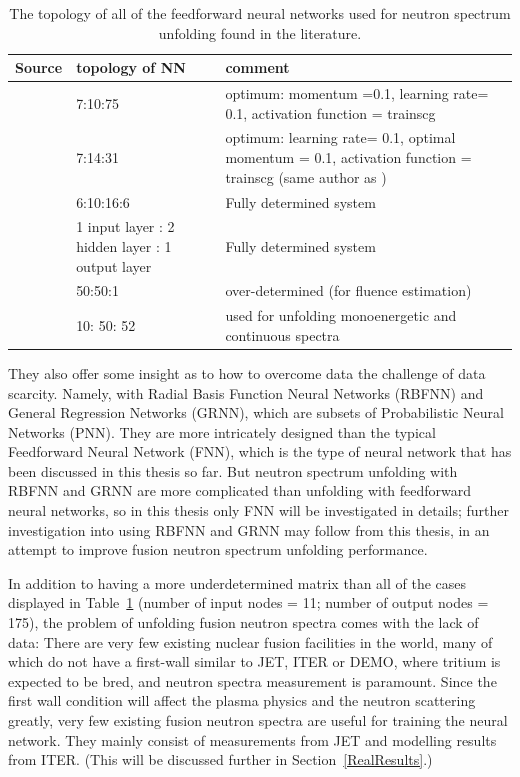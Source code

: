 \documentclass[a4paper, 12pt]{article}
\begin{document}
    \begin{table}
    \begin{tabularx}{\textwidth}{cXX}
    Source & topology of NN & comment \\
    \hline
    \cite{Rodrigues-UnfoldingCompuerCodeBasedOnANN} & 7:10:75 & optimum: momentum =0.1, learning rate= 0.1, activation function = trainscg\\
    \cite{RDANNM} & 7:14:31 & optimum: learning rate= 0.1, optimal momentum = 0.1, activation function = trainscg (same author as \cite{Rodrigues-UnfoldingCompuerCodeBasedOnANN})\\
    \cite{ANNDoseQuantitiesPrediction} & 6:10:16:6 & Fully determined system \\
    \cite{ANN-ModifiedLeastSquare} & 1 input layer : 2 hidden layer : 1 output layer & Fully determined system \\
    \cite{LancasterNN} & 50:50:1 & over-determined (for fluence estimation)\\
    \cite{ClaudiaC.BonnerSphereNNUnfolding} & 10: 50: 52 & used for unfolding monoenergetic and continuous spectra\\
    \end{tabularx}
    \caption{The topology of all of the feedforward neural networks used for neutron spectrum unfolding found in the literature.}\label{NNtopology}
    \end{table}

    They also offer some insight as to how to overcome data the challenge of data scarcity. Namely, with Radial Basis Function Neural Networks (RBFNN) and General Regression Networks (GRNN)\cite{AGeneralRegressionNeuralNetwork}, which are subsets of Probabilistic Neural Networks (PNN). They are more intricately designed than the typical Feedforward Neural Network (FNN), which is the type of neural network that has been discussed in this thesis so far.
    But neutron spectrum unfolding with RBFNN\cite{RBF-NN}\cite{ThreeAIUnfolding} and GRNN\cite{NNNeutronFluenceAmbientDoseEquivalent}\cite{unfoldingCodeBasedOnGeneralizedRegressionANN}\cite{ThreeAIUnfolding} are more complicated than unfolding with feedforward neural networks, so in this thesis only FNN will be investigated in details; further investigation into using RBFNN and GRNN may follow from this thesis, in an attempt to improve fusion neutron spectrum unfolding performance.

    In addition to having a more underdetermined matrix than all of the cases displayed in Table~\ref{NNtopology} (number of input nodes = 11; number of output nodes = 175), the problem of unfolding fusion neutron spectra comes with the lack of data:
    There are very few existing nuclear fusion facilities in the world, many of which do not have a first-wall similar to JET, ITER or DEMO, where tritium is expected to be bred, and neutron spectra measurement is paramount. Since the first wall condition will affect the plasma physics and the neutron scattering greatly, very few existing fusion neutron spectra are useful for training the neural network. They mainly consist of measurements from JET and modelling results from ITER. (This will be discussed further in Section~\ref{RealResults}.)
\end{document}
